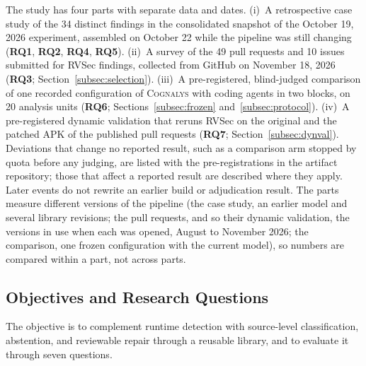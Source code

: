 \documentclass[conference]{IEEEtran}
\newcommand{\system}{\textsc{Cognalys}}
\newcommand{\researchq}[1]{\textbf{RQ#1}}
\begin{document}
The study has four parts with separate data and dates. (i)~A retrospective
case study of the 34 distinct findings in the consolidated snapshot of the
October 19, 2026 experiment, assembled on October 22 while the pipeline was
still changing (\researchq{1}, \researchq{2}, \researchq{4}, \researchq{5}).
(ii)~A survey of the 49 pull requests and 10 issues submitted for RVSec
findings, collected from GitHub on November 18, 2026 (\researchq{3};
Section~\ref{subsec:selection}). (iii)~A pre-registered, blind-judged
comparison of one recorded configuration of {\system} with coding agents in two
blocks, on 20 analysis units
(\researchq{6}; Sections~\ref{subsec:frozen} and~\ref{subsec:protocol}).
(iv)~A pre-registered dynamic validation that reruns RVSec on the original and
the patched APK of the published pull requests (\researchq{7};
Section~\ref{subsec:dynval}). Deviations that change no reported result, such
as a comparison arm stopped by quota before any judging, are listed with the
pre-registrations in the artifact repository; those that affect a reported
result are described where they apply. Later events do not rewrite an earlier
build or adjudication result. The parts measure different versions of the
pipeline (the case study, an earlier model and several library revisions; the
pull requests, and so their dynamic validation, the versions in use when each
was opened, August to November 2026; the comparison, one frozen configuration
with the current model), so numbers are compared within a part, not across
parts.

\subsection{Objectives and Research Questions}
\label{subsec:rqs}

The objective is to complement runtime detection with source-level
classification, abstention, and reviewable repair through a reusable library,
and to evaluate it through seven questions.
\end{document}
